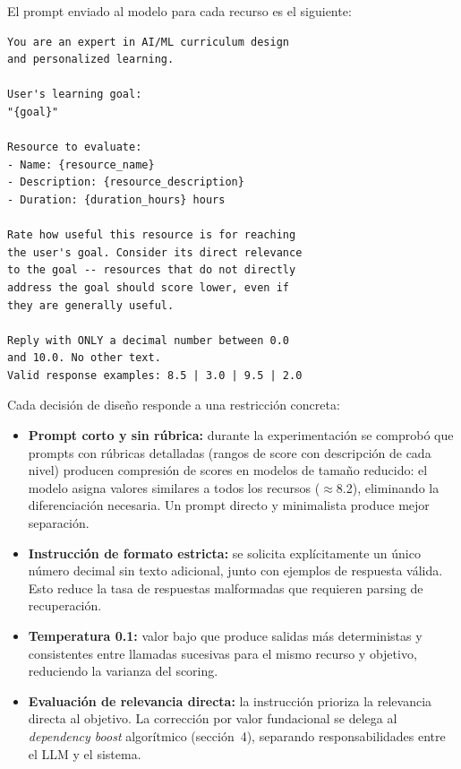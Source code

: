 \documentclass[11pt, a4paper]{article}
\begin{document}
El prompt enviado al modelo para cada recurso es el siguiente:

\begin{lstlisting}
You are an expert in AI/ML curriculum design
and personalized learning.

User's learning goal:
"{goal}"

Resource to evaluate:
- Name: {resource_name}
- Description: {resource_description}
- Duration: {duration_hours} hours

Rate how useful this resource is for reaching
the user's goal. Consider its direct relevance
to the goal -- resources that do not directly
address the goal should score lower, even if
they are generally useful.

Reply with ONLY a decimal number between 0.0
and 10.0. No other text.
Valid response examples: 8.5 | 3.0 | 9.5 | 2.0
\end{lstlisting}

Cada decisión de diseño responde a una restricción concreta:

\begin{itemize}[leftmargin=1.5em]
  \item \textbf{Prompt corto y sin rúbrica:} durante la experimentación se
        comprobó que prompts con rúbricas detalladas (rangos de score con
        descripción de cada nivel) producen compresión de scores en modelos
        de tamaño reducido: el modelo asigna valores similares a todos los
        recursos ($\approx$8.2), eliminando la diferenciación necesaria.
        Un prompt directo y minimalista produce mejor separación.
  \item \textbf{Instrucción de formato estricta:} se solicita explícitamente
        un único número decimal sin texto adicional, junto con ejemplos de
        respuesta válida. Esto reduce la tasa de respuestas malformadas que
        requieren parsing de recuperación.
  \item \textbf{Temperatura 0.1:} valor bajo que produce salidas más
        deterministas y consistentes entre llamadas sucesivas para el mismo
        recurso y objetivo, reduciendo la varianza del scoring.
  \item \textbf{Evaluación de relevancia directa:} la instrucción prioriza
        la relevancia directa al objetivo. La corrección por valor
        fundacional se delega al \emph{dependency boost} algorítmico
        (sección~4), separando responsabilidades entre el LLM y el sistema.
\end{itemize}
\end{document}
